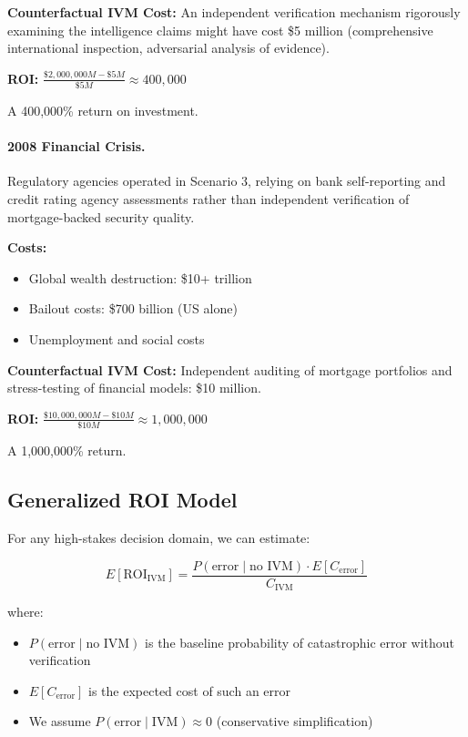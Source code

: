 \documentclass[11pt,a4paper]{article}
\begin{document}
\textbf{Counterfactual IVM Cost:} An independent verification mechanism rigorously examining the intelligence claims might have cost \$5 million (comprehensive international inspection, adversarial analysis of evidence).

\textbf{ROI:} $\frac{\$2,000,000M - \$5M}{\$5M} \approx 400,000$

A 400,000\% return on investment.

\paragraph{2008 Financial Crisis.} Regulatory agencies operated in Scenario 3, relying on bank self-reporting and credit rating agency assessments rather than independent verification of mortgage-backed security quality.

\textbf{Costs:}
\begin{itemize}
    \item Global wealth destruction: \$10+ trillion
    \item Bailout costs: \$700 billion (US alone)
    \item Unemployment and social costs
\end{itemize}

\textbf{Counterfactual IVM Cost:} Independent auditing of mortgage portfolios and stress-testing of financial models: \$10 million.

\textbf{ROI:} $\frac{\$10,000,000M - \$10M}{\$10M} \approx 1,000,000$

A 1,000,000\% return.

\subsection{Generalized ROI Model}

For any high-stakes decision domain, we can estimate:

\begin{equation}
E[\text{ROI}_{\text{IVM}}] = \frac{P(\text{error} \mid \text{no IVM}) \cdot E[C_{\text{error}}]}{C_{\text{IVM}}}
\end{equation}

where:
\begin{itemize}
    \item $P(\text{error} \mid \text{no IVM})$ is the baseline probability of catastrophic error without verification
    \item $E[C_{\text{error}}]$ is the expected cost of such an error
    \item We assume $P(\text{error} \mid \text{IVM}) \approx 0$ (conservative simplification)
\end{itemize}
\end{document}
